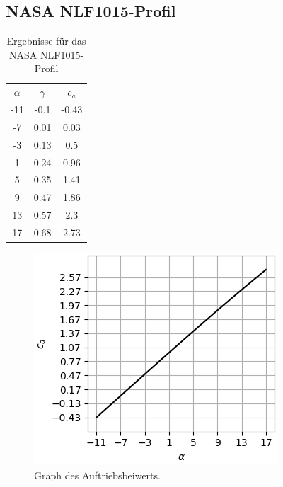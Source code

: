 \subsection{NASA NLF1015-Profil}
\begin{minipage}{0.45\textwidth}
\begin{table}[H]
    \centering
    \begin{tabular}{c|cc}
    $\alpha$ & $\gamma$ & $c_a$ \\
        -11 & -0.1 & -0.43 \\ 
-7 & 0.01 & 0.03 \\ 
-3 & 0.13 & 0.5 \\ 
1 & 0.24 & 0.96 \\ 
5 & 0.35 & 1.41 \\ 
9 & 0.47 & 1.86 \\ 
13 & 0.57 & 2.3 \\ 
17 & 0.68 & 2.73
    \end{tabular}
    \label{tab:nlf}
    \caption{Ergebnisse für das NASA NLF1015-Profil}
\end{table}
\end{minipage}
\hfill
\begin{minipage}{0.45\textwidth}
\begin{figure}[H]
    \centering
    \includegraphics[scale=0.6]{figures/nlf105ca.png}
    \caption{Graph des Auftriebsbeiwerts.}
    \label{fig:nlfca}
\end{figure}
\end{minipage}

